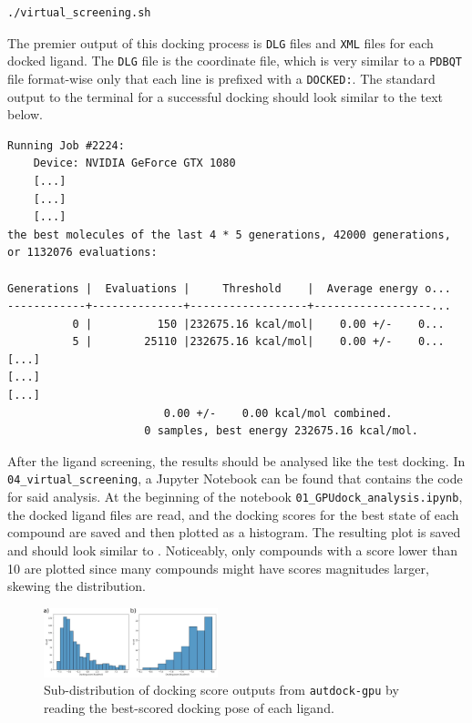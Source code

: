 \documentclass[9pt,tutorial]{livecoms}
\newcommand{\code}[1]{\colorbox{light-gray}{\texttt{#1}}}
\begin{document}
\begin{lstlisting}[language=bash]
./virtual_screening.sh
\end{lstlisting}
The premier output of this docking process is \texttt{DLG} files and \texttt{XML} files for each docked ligand. The \texttt{DLG} file is the coordinate file, which is very similar to a \texttt{PDBQT} file format-wise only that each line is prefixed with a \code{DOCKED:}. The standard output to the terminal for a successful docking should look similar to the text below.
\begin{lstlisting}[showspaces=false]
Running Job #2224:
    Device: NVIDIA GeForce GTX 1080
    [...]
    [...]
    [...]
the best molecules of the last 4 * 5 generations, 42000 generations, or 1132076 evaluations:

Generations |  Evaluations |     Threshold    |  Average energy o...
------------+--------------+------------------+------------------...
          0 |          150 |232675.16 kcal/mol|    0.00 +/-    0...
          5 |        25110 |232675.16 kcal/mol|    0.00 +/-    0...
[...]
[...]
[...]
                        0.00 +/-    0.00 kcal/mol combined.
                     0 samples, best energy 232675.16 kcal/mol.
\end{lstlisting}
After the ligand screening, the results should be analysed like the test docking. In \code{04\_virtual\_screening}, a Jupyter Notebook can be found that contains the code for said analysis. At the beginning of the notebook \code{01\_GPUdock\_analysis.ipynb}, the docked ligand files are read, and the docking scores for the best state of each compound are saved and then plotted as a histogram. The resulting plot is saved and should look similar to . Noticeably, only compounds with a score lower than 10 are plotted since many compounds might have scores magnitudes larger, skewing the distribution. 

\begin{figure}[H]
\centering
\includegraphics[width=0.45\textwidth]{figures/dockingscore_distribution_GPU.png}
\caption{Sub-distribution of docking score outputs from \code{autdock-gpu} by reading the best-scored docking pose of each ligand.}
\label{fig:dockingscore_distribution_GPU}
\end{figure}
\end{document}

